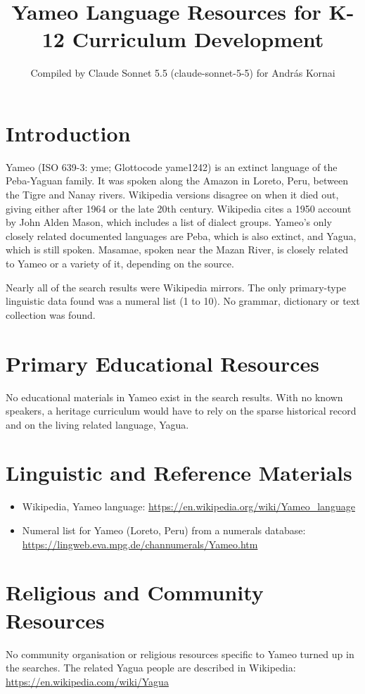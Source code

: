 \documentclass[12pt]{article}
\title{Yameo Language Resources for K-12 Curriculum Development}
\author{Compiled by Claude Sonnet 5.5 (claude-sonnet-5-5) for Andr\'as Kornai}
\date{}
\begin{document}
\maketitle

\section{Introduction}
Yameo (ISO 639-3: yme; Glottocode yame1242) is an extinct language of the Peba-Yaguan family. It was spoken along the Amazon in Loreto, Peru, between the Tigre and Nanay rivers. Wikipedia versions disagree on when it died out, giving either after 1964 or the late 20th century. Wikipedia cites a 1950 account by John Alden Mason, which includes a list of dialect groups. Yameo's only closely related documented languages are Peba, which is also extinct, and Yagua, which is still spoken. Masamae, spoken near the Mazan River, is closely related to Yameo or a variety of it, depending on the source.

Nearly all of the search results were Wikipedia mirrors. The only primary-type linguistic data found was a numeral list (1 to 10). No grammar, dictionary or text collection was found.

\section{Primary Educational Resources}
No educational materials in Yameo exist in the search results. With no known speakers, a heritage curriculum would have to rely on the sparse historical record and on the living related language, Yagua.

\section{Linguistic and Reference Materials}
\begin{itemize}
\item Wikipedia, Yameo language: \url{https://en.wikipedia.org/wiki/Yameo_language}
\item Numeral list for Yameo (Loreto, Peru) from a numerals database: \url{https://lingweb.eva.mpg.de/channumerals/Yameo.htm}
\end{itemize}

\section{Religious and Community Resources}
No community organisation or religious resources specific to Yameo turned up in the searches. The related Yagua people are described in Wikipedia: \url{https://en.wikipedia.com/wiki/Yagua}
\end{document}
